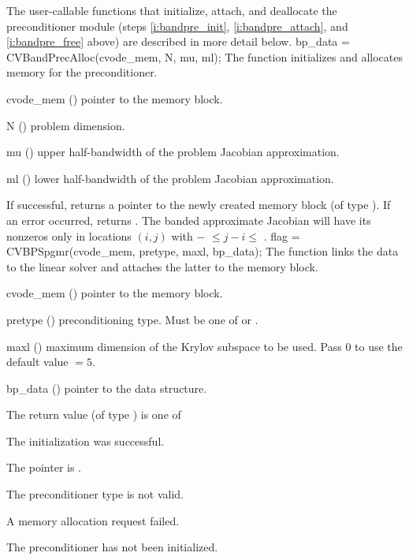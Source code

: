 The user-callable functions that initialize, attach, and deallocate
the {\cvbandpre} preconditioner module (steps \ref{i:bandpre_init},
\ref{i:bandpre_attach}, and \ref{i:bandpre_free} above) are described
in more detail below.
{
  bp\_data = CVBandPrecAlloc(cvode\_mem, N, mu, ml);
}
{
  The function  initializes and allocates
  memory for the {\cvbandpre} preconditioner.
}
{
  \begin{args}
  \item[cvode\_mem] ()
    pointer to the {\cvode} memory block.
  \item[N] ()
    problem dimension.
  \item[mu] ()
    upper half-bandwidth of the problem Jacobian approximation.
  \item[ml] ()
    lower half-bandwidth of the problem Jacobian approximation.
  \end{args}
}
{
  If successful,  returns a pointer to the newly created 
  {\cvbandpre} memory block (of type ).
  If an error occurred,  returns .
}
{
  The banded approximate Jacobian will have its nonzeros only in locations
  $(i,j)$ with $-$ $\leq j-i \leq$ .
}
{
  flag = CVBPSpgmr(cvode\_mem, pretype, maxl, bp\_data);
}
{
  The function  links the {\cvbandpre} data to the
  {\cvspgmr} linear solver and attaches the latter to the {\cvode}
  memory block.
}
{
  \begin{args}
  \item[cvode\_mem] ()
    pointer to the {\cvode} memory block.
  \item[pretype] ()
    preconditioning type. Must be one of  or .
  \item[maxl] ()
    maximum dimension of the Krylov subspace to be used. Pass $0$ to use the 
    default value  $= 5$.
  \item[bp\_data] ()
    pointer to the {\cvbandpre} data structure.
  \end{args}
}
{
  The return value  (of type ) is one of
  \begin{args}
  \item[\Id{CVSPGMR\_SUCCESS}] 
    The {\cvspgmr} initialization was successful.
  \item[\Id{CVSPGMR\_MEM\_NULL}]
    The  pointer is .
  \item[\Id{CVSPGMR\_ILL\_INPUT}]
    The preconditioner type  is not valid.
  \item[\Id{CVSPGMR\_MEM\_FAIL}]
    A memory allocation request failed.
  \item[\Id{CV\_PDATA\_NULL}]
    The {\cvbandpre} preconditioner has not been initialized.
  \end{args}
}
